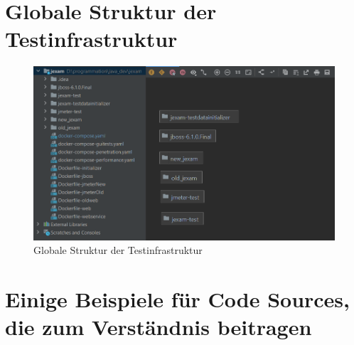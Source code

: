 \section{Globale Struktur der Testinfrastruktur}

\begin{figure}[H]
    \centering
    \includegraphics[scale=0.5]{images/global-structur}
    \caption{Globale Struktur der Testinfrastruktur} \label{fig:global-structur}
\end{figure}


\section{Einige Beispiele für Code Sources, die zum Verständnis beitragen}

